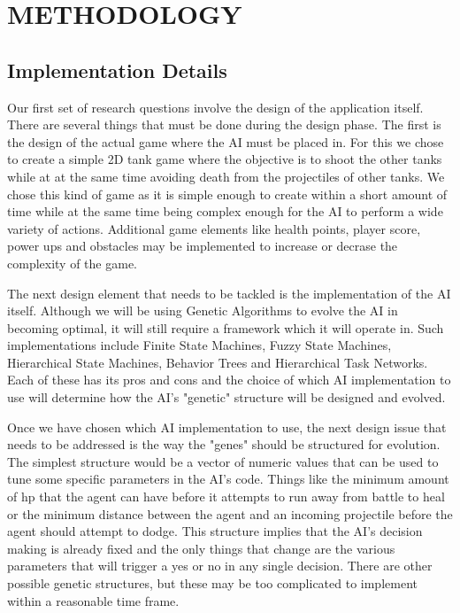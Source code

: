 \chapter{METHODOLOGY}
\section{Implementation Details}

Our first set of research questions involve the design of the application itself.
There are several things that must be done during the design phase. The first is
the design of the actual game where the AI must be placed in. For this we chose to
create a simple 2D tank game where the objective is to shoot the other tanks
while at at the same time avoiding death from the projectiles of other tanks. We
chose this kind of game as it is simple enough to create within a short amount of time
while at the same time being complex enough for the AI to perform a wide variety of
actions. Additional game elements like health points, player score, power ups and
obstacles may be implemented to increase or decrase the complexity of the game.


The next design element that needs to be tackled is the implementation of the AI itself.
Although we will be using Genetic Algorithms to evolve the AI in becoming optimal, it
will still require a framework which it will operate in. Such implementations include
Finite State Machines, Fuzzy State Machines, Hierarchical State Machines, Behavior Trees
and Hierarchical Task Networks. Each of these has its pros and cons and the choice of
which AI implementation to use will determine how the AI's "genetic" structure will be
designed and evolved.


Once we have chosen which AI implementation to use, the next design issue that needs to
be addressed is the way the "genes" should be structured for evolution. The simplest
structure would be a vector of numeric values that can be used to tune some specific
parameters in the AI's code. Things like the minimum amount of hp that the agent can have
before it attempts to run away from battle to heal or the minimum distance between the
agent and an incoming projectile before the agent should attempt to dodge. This structure
implies that the AI's decision making is already fixed and the only things that change
are the various parameters that will trigger a yes or no in any single decision. There
are other possible genetic structures, but these may be too complicated to implement
within a reasonable time frame.